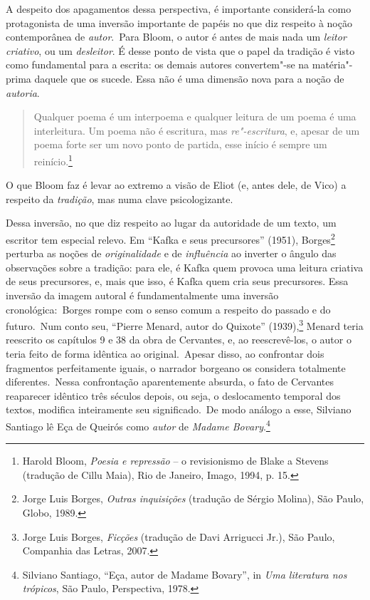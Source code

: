 A despeito dos apagamentos dessa perspectiva, é importante considerá-la
como protagonista de uma inversão importante de papéis no que diz
respeito à noção contemporânea de \emph{autor}.~Para Bloom, o autor é
antes de mais nada um \emph{leitor criativo}, ou um \emph{desleitor}. É
desse ponto de vista que o papel da tradição é visto como fundamental
para a escrita: os demais autores convertem"-se na matéria"-prima daquele
que os sucede. Essa não é uma dimensão nova para a noção
de \emph{autoria}.

\begin{quote}
Qualquer poema é um interpoema e qualquer leitura de um poema é uma
interleitura. Um poema não é escritura, mas \emph{re"-escritura}, e,
apesar de um poema forte ser um novo ponto de partida, esse início é
sempre um reinício.\footnote{Harold Bloom, \emph{Poesia e repressão} --
  o revisionismo de Blake a Stevens (tradução de Cillu Maia), Rio de
  Janeiro, Imago, 1994, p. 15.}
\end{quote}

O que Bloom faz é levar ao extremo a visão de Eliot (e, antes dele, de
Vico) a respeito da \emph{tradição}, mas numa clave psicologizante.

Dessa inversão, no que diz respeito ao lugar da autoridade de um texto,
um escritor tem especial relevo. Em ``Kafka e seus precursores'' (1951),
Borges\footnote{Jorge Luis Borges, \emph{Outras inquisições} (tradução
  de Sérgio Molina), São Paulo, Globo, 1989.} perturba as noções de
\emph{originalidade} e de \emph{influência} ao inverter o ângulo das
observações sobre a tradição: para ele, é Kafka quem provoca uma leitura
criativa de seus precursores, e, mais que isso, é Kafka quem cria seus
precursores. Essa inversão da imagem autoral é fundamentalmente uma
inversão cronológica:~Borges rompe com o senso comum a respeito do
passado e do futuro.~Num conto seu, ``Pierre Menard, autor do Quixote''
(1939),\footnote{Jorge Luis Borges, \emph{Ficções} (tradução de Davi
  Arrigucci Jr.), São Paulo, Companhia das Letras, 2007.} Menard teria
reescrito os capítulos 9 e 38 da obra de Cervantes, e, ao reescrevê-los,
o autor o teria feito de forma idêntica ao original.~Apesar disso, ao
confrontar dois fragmentos perfeitamente iguais, o narrador borgeano os
considera totalmente diferentes.~Nessa confrontação aparentemente
absurda, o fato de Cervantes reaparecer idêntico três séculos depois, ou
seja, o deslocamento temporal dos textos, modifica inteiramente seu
significado.~De modo análogo a esse, Silviano Santiago lê Eça de Queirós
como \emph{autor} de \emph{Madame Bovary}.\footnote{Silviano Santiago,
  ``Eça, autor de Madame Bovary'', in \emph{Uma literatura nos
  trópicos}, São Paulo, Perspectiva, 1978.}

